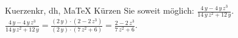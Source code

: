 \begin{MAufgabe}{Kuerzen}{kr, dh, MaTeX}
K\"urzen Sie soweit m\"oglich: $\frac{4\, y - 4\, y\, z^3}{14\, y\, z^2 + 12\, y}$.\\ 
\ifLsg\MLoesung
\quad $\frac{4\, y - 4\, y\, z^3}{14\, y\, z^2 + 12\, y}=\frac{(2\, y)\cdot(2 - 2\, z^3)}{(2\, y)\cdot(7\, z^2 + 6)}=\frac{2 - 2\, z^3}{7\, z^2 + 6}$.\else\relax\fi
 \end{MAufgabe}